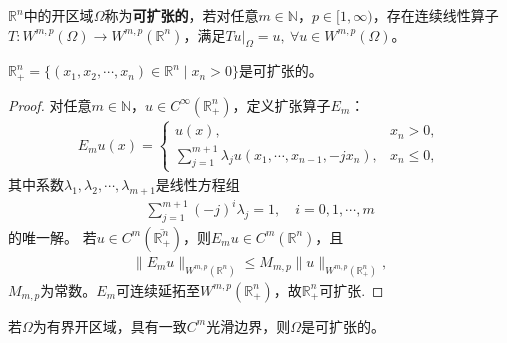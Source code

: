\documentclass[../../main.tex]{subfiles}%
\begin{document}
\begin{definition}
$\mathbb{R}^{n}$中的开区域$\Omega$称为\textbf{可扩张的}，若对任意$m\in\mathbb{N}$，$p\in[1,\infty)$，存在连续线性算子$T:W^{m,p}(\Omega)\to W^{m,p}(\mathbb{R}^{n})$，满足$Tu|_{\Omega}=u,\ \forall u\in W^{m,p}(\Omega)$。
\end{definition}

\begin{example}
$\mathbb{R}_{+}^{n}=\{(x_{1},x_{2},\cdots,x_{n})\in\mathbb{R}^{n}\mid x_{n}>0\}$是可扩张的。
\end{example}

\begin{proof}

对任意$m\in\mathbb{N}$，$u\in C^{\infty}(\mathbb{R}_{+}^{n})$，定义扩张算子$E_{m}$：
\begin{align*}
E_{m}u(x)=
\begin{cases}
u(x),&x_{n}>0,\\
\sum\limits_{j=1}^{m+1}\lambda_{j}u(x_{1},\cdots,x_{n-1},-jx_{n}),&x_{n}\leqslant 0,
\end{cases}
\end{align*}
其中系数$\lambda_{1},\lambda_{2},\cdots,\lambda_{m+1}$是线性方程组
\begin{align*}
\sum\limits_{j=1}^{m+1}(-j)^{i}\lambda_{j}=1,\quad i=0,1,\cdots,m
\end{align*}
的唯一解。
若$u\in C^{m}(\overline{\mathbb{R}_{+}^{n}})$，则$E_{m}u\in C^{m}(\mathbb{R}^{n})$，且
\begin{align*}
\|E_{m}u\|_{W^{m,p}(\mathbb{R}^{n})}\leqslant M_{m,p}\|u\|_{W^{m,p}(\mathbb{R}_{+}^{n})},
\end{align*}
$M_{m,p}$为常数。$E_{m}$可连续延拓至$W^{m,p}(\mathbb{R}_{+}^{n})$，故$\mathbb{R}_{+}^{n}$可扩张.

\end{proof}

\begin{example}
若$\Omega$为有界开区域，具有一致$C^{m}$光滑边界，则$\Omega$是可扩张的。
\end{example}
\end{document}
